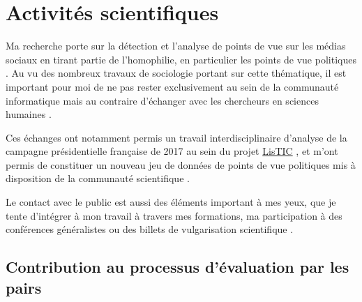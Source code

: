 \documentclass[firstName=Ophélie, lastName=Fraisier]{academicCV}
\begin{document}



\section{Activités scientifiques}
	Ma recherche porte sur la détection et l'analyse de points de vue sur les médias sociaux en tirant partie de l'homophilie, en particulier les points de vue politiques \cite{FavreEtAl2017,FraisierEtAl2018b,FraisierEtAl2017a,FraisierEtAl2017b,FraisierEtAl2016}.
%
	Au vu des nombreux travaux de sociologie portant sur cette thématique, il est important pour moi de ne pas rester exclusivement au sein de la communauté informatique mais au contraire d'échanger avec les chercheurs en sciences humaines \cite{FraisierEtAl2018c,FraisierEtAl2017c}.

\vspace{2mm}
	Ces échanges ont notamment permis un travail interdisciplinaire d'analyse de la campagne présidentielle française de 2017 au sein du projet \href{https://listic.irit.fr}{LisTIC} \cite{MarchandEtAl2018,BenbouzidEtAl2017}, et m'ont permis de constituer un nouveau jeu de données de points de vue politiques mis à disposition de la communauté scientifique \cite{FraisierEtAl2018a}.

\vspace{2mm}
	Le contact avec le public est aussi des éléments important à mes yeux, que je tente d'intégrer à mon travail à travers mes formations, ma participation à des conférences généralistes ou des billets de vulgarisation scientifique \cite{Fraisier2017, FraisierEtAl2018d}.




\subsection{Contribution au processus d'évaluation par les pairs}
\end{document}
